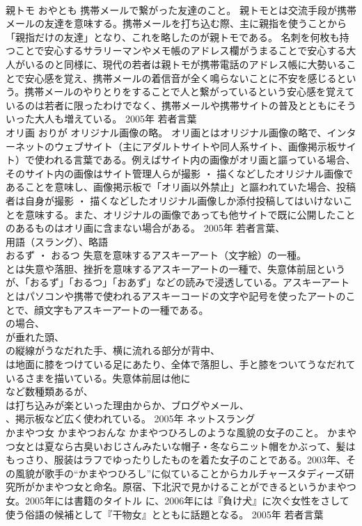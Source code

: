 \documentclass[8pt]{extreport}
\begin{document}
\begin{CJK}{UTF8}{min}
\\	親トモ	おやとも	携帯メールで繋がった友達のこと。	親トモとは交流手段が携帯メールの友達を意味する。携帯メールを打ち込む際、主に親指を使うことから「親指だけの友達」となり、これを略したのが親トモである。 名刺を何枚も持つことで安心するサラリーマンやメモ帳のアドレス欄がうまることで安心する大人がいるのと同様に、現代の若者は親トモが携帯電話のアドレス帳に大勢いることで安心感を覚え、携帯メールの着信音が全く鳴らないことに不安を感じるという。携帯メールのやりとりをすることで人と繋がっているという安心感を覚えているのは若者に限ったわけでなく、携帯メールや携帯サイトの普及とともにそういった大人も増えている。	2005年	若者言葉	
\\	オリ画	おりが	オリジナル画像の略。	オリ画とはオリジナル画像の略で、インターネットのウェブサイト（主にアダルトサイトや同人系サイト、画像掲示板サイト）で使われる言葉である。例えばサイト内の画像がオリ画と謳っている場合、そのサイト内の画像はサイト管理人らが撮影 ・ 描くなどしたオリジナル画像であることを意味し、画像掲示板で「オリ画以外禁止」と謳われていた場合、投稿者は自身が撮影 ・ 描くなどしたオリジナル画像しか添付投稿してはいけないことを意味する。また、オリジナルの画像であっても他サイトで既に公開したことのあるものはオリ画に含まない場合がある。	2005年	若者言葉、
\\	用語（スラング）、略語	
\\	おるず ・ おるつ	失意を意味するアスキーアート（文字絵）の一種。	
\\	とは失意や落胆、挫折を意味するアスキーアートの一種で、失意体前屈というが、「おるず」「おるつ」「おあず」などの読みで浸透している。アスキーアート
\\	とはパソコンや携帯で使われるアスキーコードの文字や記号を使ったアートのことで、顔文字もアスキーアートの一種である。
\\	の場合、
\\	が垂れた頭、
\\	の縦線がうなだれた手、横に流れる部分が背中、
\\	は地面に膝をつけている足にあたり、全体で落胆し、手と膝をついてうなだれているさまを描いている。失意体前屈は他に　
\\	など数種類あるが、
\\	は打ち込みが楽といった理由からか、ブログやメール、
\\	、掲示板など広く使われている。	2005年	ネットスラング	
\\	かまやつ女	かまやつおんな	かまやつひろしのような風貌の女子のこと。	かまやつ女とは夏なら古臭いおじさんみたいな帽子・冬ならニット帽をかぶって、髪はもっさり、服装はラフでゆったりしたものを着た女子のことである。2003年、その風貌が歌手の“かまやつひろし”に似ていることからカルチャースタディーズ研究所がかまやつ女と命名。原宿、下北沢で見かけることができるというかまやつ女。2005年には書籍のタイトル に、2006年には『負け犬』に次ぐ女性をさして使う俗語の候補として『干物女』とともに話題となる。	2005年	若者言葉	

\end{CJK}
\end{document}

